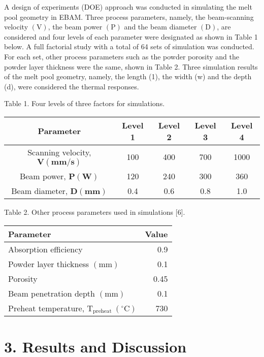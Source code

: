 \documentclass[10pt]{article}
\begin{document}
A design of experiments (DOE) approach was conducted in simulating the melt pool geometry in EBAM. Three process parameters, namely, the beam-scanning velocity $(\mathrm{V})$, the beam power $(\mathrm{P})$ and the beam diameter $(\mathrm{D})$, are considered and four levels of each parameter were designated as shown in Table 1 below. A full factorial study with a total of 64 sets of simulation was conducted. For each set, other process parameters such as the powder porosity and the powder layer thickness were the same, shown in Table 2. Three simulation results of the melt pool geometry, namely, the length (1), the width (w) and the depth (d), were considered the thermal responses.

Table 1. Four levels of three factors for simulations.

\begin{center}
\begin{tabular}{c|c|c|c|c}
\hline
Parameter & Level 1 & Level 2 & Level 3 & Level 4 \\
\hline
Scanning velocity, $\boldsymbol{V}(\mathbf{m m} / \mathbf{s})$ & 100 & 400 & 700 & 1000 \\
Beam power, $\boldsymbol{P}(\mathbf{W})$ & 120 & 240 & 300 & 360 \\
Beam diameter, $\boldsymbol{D}(\mathbf{m m})$ & 0.4 & 0.6 & 0.8 & 1.0 \\
\hline
\end{tabular}
\end{center}

Table 2. Other process parameters used in simulations [6].

\begin{center}
\begin{tabular}{l|r}
\hline
Parameter & Value \\
\hline
Absorption efficiency & 0.9 \\
Powder layer thickness $(\mathrm{mm})$ & 0.1 \\
Porosity & 0.45 \\
Beam penetration depth $(\mathrm{mm})$ & 0.1 \\
Preheat temperature, $\mathrm{T}_{\text {preheat }}\left({ }^{\circ} \mathrm{C}\right)$ & 730 \\
\hline
\end{tabular}
\end{center}

\section*{3. Results and Discussion}
\end{document}
